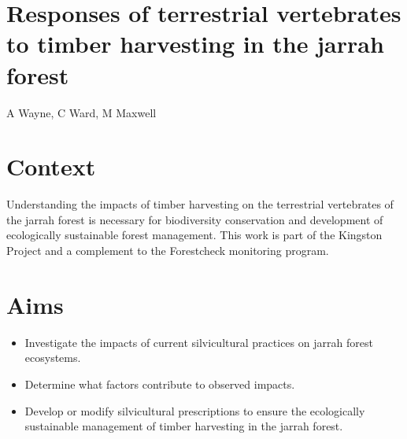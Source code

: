 \documentclass[version=last,
    paper=a4, %
    10pt, %
    usenames,
    dvipsnames,
    oneside, %
    headings=openany, %
    DIV=15 %
]{scrbook}
\begin{document}
\section*{Responses of terrestrial vertebrates to timber harvesting in the jarrah
forest
}

A Wayne, C Ward, M Maxwell


\section*{Context}
Understanding the impacts of timber harvesting on the terrestrial
vertebrates of the jarrah forest is necessary for biodiversity
conservation and development of ecologically sustainable forest
management. This work is part of the Kingston Project and a complement
to the Forestcheck monitoring program.



\section*{Aims}
\begin{itemize}
\itemsep1pt\parskip0pt
\item
  Investigate the impacts of current silvicultural practices on jarrah
  forest ecosystems.
\item
  Determine what factors contribute to observed impacts.
\item
  Develop or modify silvicultural prescriptions to ensure the
  ecologically sustainable management of timber harvesting in the jarrah
  forest.
\end{itemize}
\end{document}
